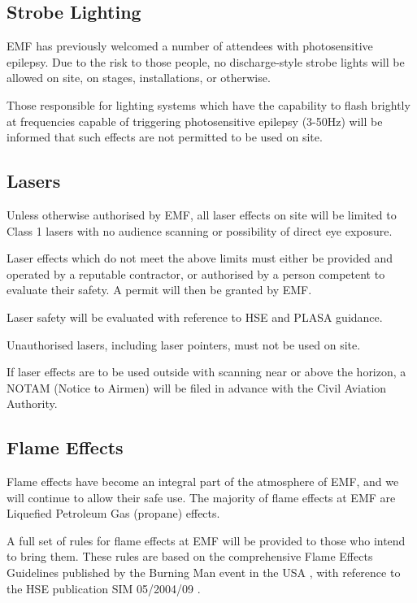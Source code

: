\subsection{Strobe Lighting}
EMF has previously welcomed a number of attendees with photosensitive epilepsy.
Due to the risk to those people, no discharge-style strobe lights will be allowed
on site, on stages, installations, or otherwise.

Those responsible for lighting systems which have the capability to flash brightly
at frequencies capable of triggering photosensitive epilepsy (3-50Hz) will be
informed that such effects are not permitted to be used on site.

\subsection{Lasers}\label{lasers}
Unless otherwise authorised by EMF, all laser effects on site will be limited to
Class 1 lasers with no audience scanning or possibility of direct eye exposure.

Laser effects which do not meet the above limits must either be provided and
operated by a reputable contractor, or authorised by a person competent to
evaluate their safety. A permit will then be granted by EMF.

Laser safety will be evaluated with reference to HSE \cite{hselaser} and
PLASA \cite{plasalaser} guidance.

Unauthorised lasers, including laser pointers, must not be used on site.

If laser effects are to be used outside with scanning near or above the
horizon, a NOTAM (Notice to Airmen) will be filed in advance with the Civil
Aviation Authority.

\subsection{Flame Effects}\label{flameeffects}
Flame effects have become an integral part of the atmosphere of EMF, and
we will continue to allow their safe use. The majority of flame effects
at EMF are Liquefied Petroleum Gas (propane) effects.

A full set of rules for flame effects at EMF will be provided to those
who intend to bring them. These rules are based on the comprehensive
Flame Effects Guidelines published by the Burning Man event in the USA \cite{bmflame},
with reference to the HSE publication SIM 05/2004/09 \cite{lpgsim}.

